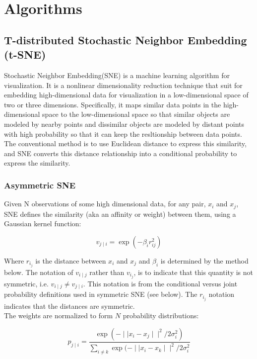 \part{Algorithms} \label{part:three algorithms}

\chapter{T-distributed Stochastic Neighbor Embedding (t-SNE)}

Stochastic Neighbor Embedding(SNE) is a machine learning algorithm for visualization. It is a nonlinear dimensionality reduction technique that suit for embedding high-dimensional data for visualization in a low-dimensional space of two or three dimensions. Specifically, it maps similar data points in the high-dimensional space to the low-dimensional space so that similar objects are modeled by nearby points and dissimilar objects are modeled by distant points with high probability so that it can keep the resltionship between data points. The conventional method is to use Euclidean distance to express this similarity, and SNE converts this distance relationship into a conditional probability to express the similarity. 

\section{Asymmetric SNE}

Given N observations of some high dimensional data, for any pair, $x_i$ and $x_j$, SNE defines the similarity (aka an affinity or weight) between them, using a Gaussian kernel function:

\begin{equation*}
    {v_{j\mid i}} = \exp {(-\beta_i r^2_{ij})} 
\end{equation*}

\noindent Where $r_i_j$ is the distance between $x_i$ and $x_j$ and $\beta_i$ is determined by the method below. The notation of $v_{i \mid j}$ rather than $v_i_j$, is to indicate that this quantity is not symmetric, i.e. $v_{i \mid j} \neq v_{j \mid i}$. This notation is from the conditional versus joint probability definitions used in symmetric SNE (see below). The $r_i_j$ notation indicates that the distances are symmetric.\\

\noindent The weights are normalized to form $N$ probability distributions:

\begin{equation*}
    {p_{j\mid i}} = \frac{\exp(-\mid \mid x_i - x_j \mid \mid^2/ 2 \sigma_i^2)}{\sum_{i\neq k}\exp(-\mid \mid x_i - x_k \mid \mid^2/ 2 \sigma_i^2}
\end{equation*}

